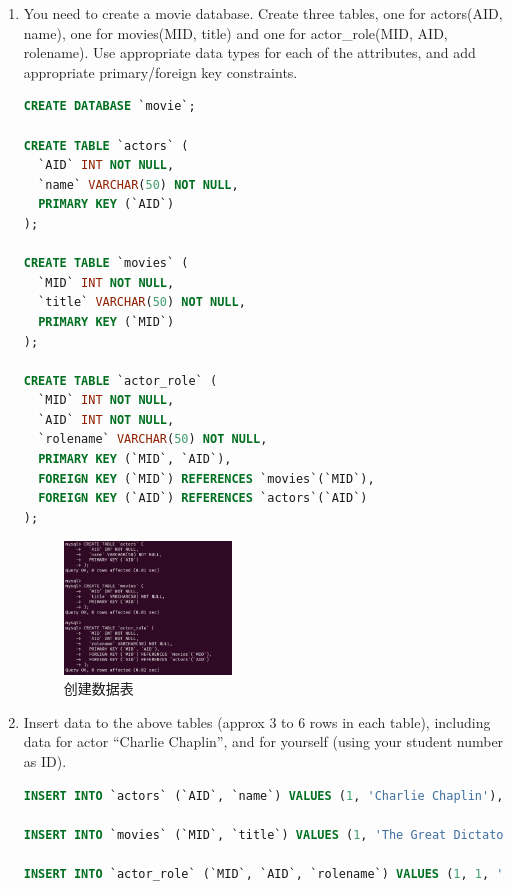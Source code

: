\documentclass{article}
\begin{document}
\begin{enumerate}
\item You need to create a movie database. Create three tables, one for actors(AID, name), one for
movies(MID, title) and one for actor\_role(MID, AID, rolename). Use appropriate data types
for each of the attributes, and add appropriate primary/foreign key constraints.

\begin{lstlisting}[language=sql]
CREATE DATABASE `movie`;

CREATE TABLE `actors` (
  `AID` INT NOT NULL,
  `name` VARCHAR(50) NOT NULL,
  PRIMARY KEY (`AID`)
);

CREATE TABLE `movies` (
  `MID` INT NOT NULL,
  `title` VARCHAR(50) NOT NULL,
  PRIMARY KEY (`MID`)
);

CREATE TABLE `actor_role` (
  `MID` INT NOT NULL,
  `AID` INT NOT NULL,
  `rolename` VARCHAR(50) NOT NULL,
  PRIMARY KEY (`MID`, `AID`),
  FOREIGN KEY (`MID`) REFERENCES `movies`(`MID`),
  FOREIGN KEY (`AID`) REFERENCES `actors`(`AID`)
);
\end{lstlisting}

\begin{figure}[H]
\centering
\includegraphics[width=0.42\textwidth]{img/15.png}
\caption{创建数据表}
\end{figure}

\item Insert data to the above tables (approx 3 to 6 rows in each table), including data for actor “Charlie Chaplin”, and for yourself (using your student number as ID).

\begin{lstlisting}[language=sql]
INSERT INTO `actors` (`AID`, `name`) VALUES (1, 'Charlie Chaplin'), (2, 'John Doe'), (460, 'Pengda Li');

INSERT INTO `movies` (`MID`, `title`) VALUES (1, 'The Great Dictator'), (2, 'Modern Times'), (3, 'City Lights');

INSERT INTO `actor_role` (`MID`, `AID`, `rolename`) VALUES (1, 1, 'Adenoid Hynkel'), (2, 1, 'The Tramp'), (3, 1, 'A Tramp'), (1, 2, 'Extra'), (2, 2, 'Extra'), (3, 460, 'Director');
\end{lstlisting}


\end{enumerate}
\end{document}
